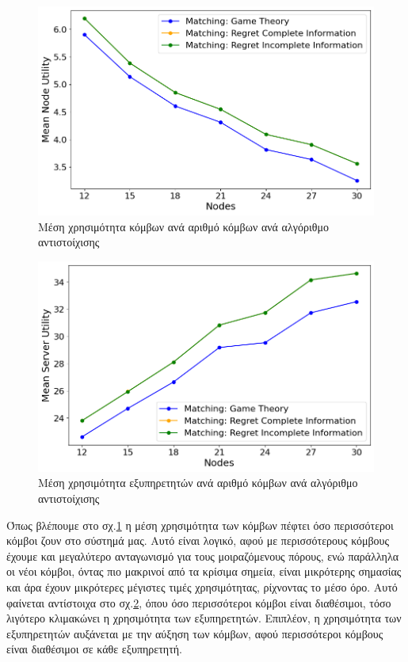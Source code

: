 \begin{figure}[H]
    \centering
    \includegraphics[width=\textwidth]{figures/chapter4/Mean_User_Utility_vs_Users.png}
    \caption{Μέση χρησιμότητα κόμβων ανά αριθμό κόμβων ανά αλγόριθμο αντιστοίχισης}
    \label{fig37}
\end{figure}

\newpage

\begin{figure}[H]
    \centering
    \includegraphics[width=\textwidth]{figures/chapter4/Mean_Server_Utility_vs_Users.png}
    \caption{Μέση χρησιμότητα εξυπηρετητών ανά αριθμό κόμβων ανά αλγόριθμο αντιστοίχισης}
    \label{fig38}
\end{figure}

Όπως βλέπουμε στο σχ.\ref{fig37} η μέση χρησιμότητα των κόμβων πέφτει όσο περισσότεροι κόμβοι ζουν στο σύστημά μας. Αυτό είναι λογικό, αφού με περισσότερους κόμβους έχουμε και μεγαλύτερο ανταγωνισμό για τους μοιραζόμενους πόρους, ενώ παράλληλα οι νέοι κόμβοι, όντας πιο μακρινοί από τα κρίσιμα σημεία, είναι μικρότερης σημασίας και άρα έχουν μικρότερες μέγιστες τιμές χρησιμότητας, ρίχνοντας το μέσο όρο. Αυτό φαίνεται αντίστοιχα στο σχ.\ref{fig38}, όπου όσο περισσότεροι κόμβοι είναι διαθέσιμοι, τόσο λιγότερο κλιμακώνει η χρησιμότητα των εξυπηρετητών. Επιπλέον, η χρησιμότητα των εξυπηρετητών αυξάνεται με την αύξηση των κόμβων, αφού περισσότεροι κόμβους είναι διαθέσιμοι σε κάθε εξυπηρετητή.


